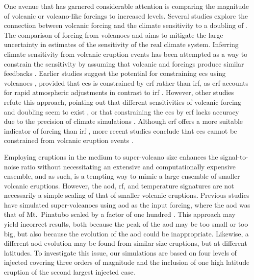 \documentclass{ametsocV6.1}
\newcommand{\iso}[1][i]{{#1}njected \ce{SO2}}
\begin{document}
One avenue that has garnered considerable attention is comparing the magnitude of
volcanic or volcano-like forcings to increased  levels. Several studies explore
the connection between volcanic forcing and the climate sensitivity to a doubling of
\citep{boer2007,marvel2016,merlis2014,ollila2016,richardson2019,salvi2022,wigley2005}.
The comparison of forcing from volcanoes and  aims to mitigate the large
uncertainty in estimates of the sensitivity of the real climate system. Inferring
climate sensitivity from volcanic eruption events has been attempted as a way to
constrain the sensitivity \citep{boer2007} by assuming that volcanic and 
forcings produce similar feedbacks \citep{pauling2023}. Earlier studies suggest the
potential for constraining \gls{ecs} using volcanoes \citep{bender2010}, provided that
\gls{ecs} is constrained by \gls{erf} rather than \gls{irf}, as \gls{erf} accounts for
rapid atmospheric adjustments in contrast to \gls{irf} \citep{richardson2019}. However,
other studies refute this approach, pointing out that different sensitivities of
volcanic forcing and  doubling seem to exist \citep{douglass2006}, or that
constraining the \gls{ecs} by \gls{erf} lacks accuracy due to the precision of climate
simulations \citep{boer2007,salvi2022}. Although \gls{erf} offers a more suitable
indicator of forcing than \gls{irf} \citep{marvel2016,richardson2019}, more recent
studies conclude that \gls{ecs} cannot be constrained from volcanic eruption events
\citep{pauling2023}.

Employing eruptions in the medium to super-volcano size enhances the signal-to-noise
ratio without necessitating an extensive and computationally expensive ensemble, and as
such, is a tempting way to mimic a large ensemble of smaller volcanic eruptions.
However, the \gls{aod}, \gls{rf}, and temperature signatures are not necessarily a
simple scaling of that of smaller volcanic eruptions. Previous studies have simulated
super-volcanoes using \gls{aod} as the input forcing, where the \gls{aod} was that of
Mt.\ Pinatubo scaled by a factor of one hundred \citep{jones2005}. This approach may
yield incorrect results, both because the peak of the \gls{aod} may be too small or too
big, but also because the evolution of the \gls{aod} could be inappropriate. Likewise, a
different \gls{aod} evolution may be found from similar size eruptions, but at different
latitudes. To investigate this issue, our simulations are based on four levels of \iso{}
covering three orders of magnitude and the inclusion of one high latitude eruption of
the second largest \iso{} case.
\end{document}
